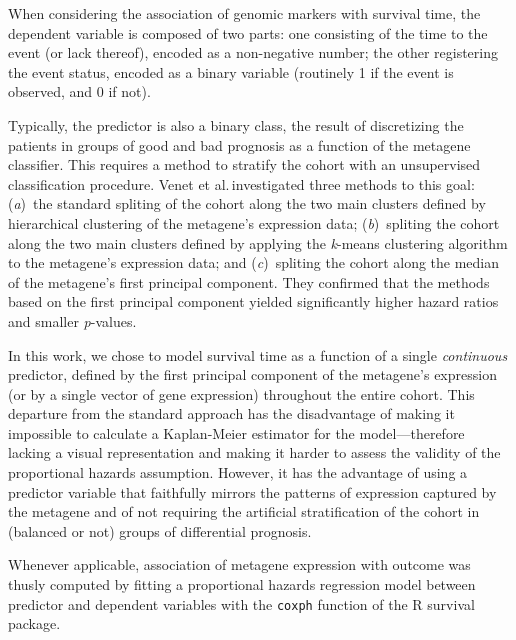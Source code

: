 \medskip

When considering the association of genomic markers with survival time, the
dependent variable is composed of two parts: one consisting of the time to the
event (or lack thereof), encoded as a non-negative number; the other registering
the event status, encoded as a binary variable (routinely 1 if the event is
observed, and 0 if not).

Typically, the predictor is also a binary class, the result of discretizing the
patients in groups of good and bad prognosis as a function of the metagene
classifier.  This requires a method to stratify the cohort with an unsupervised
classification procedure.  Venet et al.\cite{venet_most_2011}\,investigated
three methods to this goal: (\emph{a})~the standard spliting of the cohort along
the two main clusters defined by hierarchical clustering of the metagene's
expression data;
(\emph{b})~spliting the cohort along the two main clusters defined
by applying the \emph{k}-means clustering algorithm to the metagene's expression
data;
and (\emph{c})~spliting the cohort along the median of the metagene's first
principal component.
They confirmed that the methods based on the first principal
component %
yielded significantly higher hazard ratios and smaller \emph{p}-values.

In this work, we chose to model survival time as a function of a single
\emph{continuous} predictor, defined by the first principal component of the
metagene's expression (or by a single vector of gene expression) throughout the
entire cohort.  This departure from the standard approach has the disadvantage
of making it impossible to calculate a Kaplan-Meier estimator for the
model---therefore lacking a visual representation and making it harder to assess
the validity of the proportional hazards assumption.  However, it has the
advantage of using a predictor variable that faithfully mirrors the patterns of
expression captured by the metagene and of not requiring the artificial
stratification of the cohort in (balanced or not) groups of differential
prognosis.

Whenever applicable, association of metagene expression with outcome was thusly
computed by fitting a proportional hazards regression model between predictor
and dependent variables with the \texttt{coxph} function of the \textsf{R}
\textsf{survival} package.


